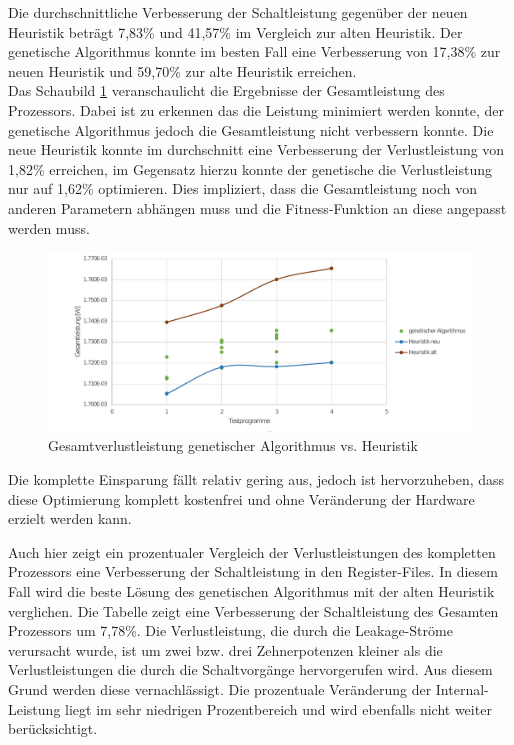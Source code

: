 Die durchschnittliche Verbesserung der Schaltleistung gegenüber der neuen Heuristik beträgt 7,83\% und 41,57\% im Vergleich zur alten Heuristik. Der genetische Algorithmus konnte im besten Fall eine Verbesserung von 17,38\% zur neuen Heuristik und 59,70\% zur alte Heuristik erreichen.\\
Das Schaubild \ref{fig:eval_genetic_total_power} veranschaulicht die Ergebnisse der Gesamtleistung des Prozessors. Dabei ist zu erkennen das die Leistung minimiert werden konnte, der genetische Algorithmus jedoch die Gesamtleistung nicht verbessern konnte. Die neue Heuristik konnte im durchschnitt eine Verbesserung der Verlustleistung von 1,82\% erreichen, im Gegensatz hierzu konnte der genetische die Verlustleistung nur auf 1,62\% optimieren. Dies impliziert, dass die Gesamtleistung noch von anderen Parametern abhängen muss und die Fitness-Funktion an diese angepasst werden muss.

\begin{figure}[H]
	\centering
	\includegraphics[width=\textwidth]{fig/gesamtleistung_genetik_heuristik.pdf}
	\caption{Gesamtverlustleistung genetischer Algorithmus vs. Heuristik}
	\label{fig:eval_genetic_total_power}
\end{figure}

Die komplette Einsparung fällt relativ gering aus, jedoch ist hervorzuheben, dass diese Optimierung komplett \glqq kostenfrei \grqq und ohne Veränderung der Hardware erzielt werden kann.
%

Auch hier zeigt ein prozentualer Vergleich der Verlustleistungen des kompletten Prozessors eine Verbesserung der Schaltleistung in den Register-Files. In diesem Fall wird die beste Lösung des genetischen Algorithmus mit der alten Heuristik verglichen. Die Tabelle zeigt eine Verbesserung der Schaltleistung des Gesamten Prozessors um 7,78\%. Die Verlustleistung, die durch die Leakage-Ströme verursacht wurde, ist um zwei bzw. drei Zehnerpotenzen kleiner als die Verlustleistungen die durch die Schaltvorgänge hervorgerufen wird. Aus diesem Grund werden diese vernachlässigt. 
Die prozentuale Veränderung der Internal-Leistung liegt im sehr niedrigen Prozentbereich und wird ebenfalls nicht weiter berücksichtigt. 

